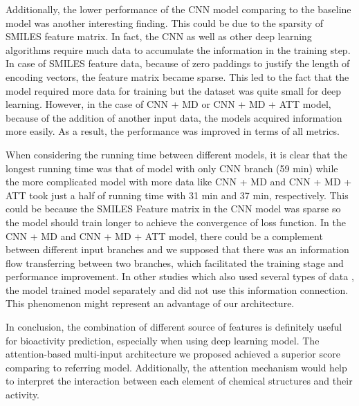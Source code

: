 \documentclass[conference]{IEEEtran}
\begin{document}
Additionally, the lower performance of the CNN model comparing to the baseline model was another interesting finding. This could be due to the sparsity of SMILES feature matrix. In fact, the CNN as well as other deep learning algorithms require much data to accumulate the information in the training step. In case of SMILES feature data, because of zero paddings to justify the length of encoding vectors, the feature matrix became sparse. This led to the fact that the model required more data for training but the dataset was quite small for deep learning. However, in the case of CNN + MD or CNN + MD + ATT model, because of the addition of another input data, the models acquired information more easily. As a result, the performance was improved in terms of all metrics.

When considering the running time between different models, it is clear that the longest running time was that of model with only CNN branch (59 min) while the more complicated model with more data like CNN + MD and CNN + MD + ATT took just a half of running time with 31 min and 37 min, respectively. This could be because the SMILES Feature matrix in the CNN model was sparse so the model should train longer to achieve the convergence of loss function. In the CNN + MD and CNN + MD + ATT model, there could be a complement between different input branches and we supposed that there was an information flow transferring between two branches, which facilitated the training stage and performance improvement. In other studies which also used several types of data \cite{Koch2013, Koch2013a}, the model trained model separately and did not use this information connection. This phenomenon might represent an advantage of our architecture.

In conclusion, the combination of different source of features is definitely useful for bioactivity prediction, especially when using deep learning model. The attention-based multi-input architecture we proposed achieved a superior score comparing to referring model. Additionally, the attention mechanism would help to interpret the interaction between each element of chemical structures and their activity. 


\end{document}
